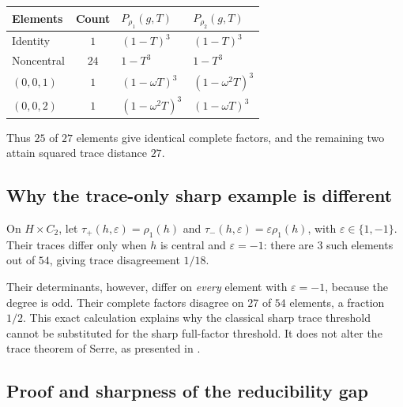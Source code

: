 \documentclass[11pt]{article}
\theoremstyle{definition}\newtheorem{definition}[theorem]{Definition}
\theoremstyle{remark}\newtheorem{remark}[theorem]{Remark}
\begin{document}
\begin{center}
\begin{tabular}{@{}lcll@{}}\toprule
Elements & Count & $P_{\rho_1}(g,T)$ & $P_{\rho_2}(g,T)$\\\midrule
Identity & $1$ & $(1-T)^3$ & $(1-T)^3$\\
Noncentral & $24$ & $1-T^3$ & $1-T^3$\\
$(0,0,1)$ & $1$ & $(1-\omega T)^3$ & $(1-\omega^2T)^3$\\
$(0,0,2)$ & $1$ & $(1-\omega^2T)^3$ & $(1-\omega T)^3$\\\bottomrule
\end{tabular}
\end{center}
Thus $25$ of $27$ elements give identical complete factors, and the remaining two attain squared trace distance $27$.

\subsection{Why the trace-only sharp example is different}

On $H\times C_2$, let $\tau_+(h,\varepsilon)=\rho_1(h)$ and
$\tau_-(h,\varepsilon)=\varepsilon\rho_1(h)$, with $\varepsilon\in\{1,-1\}$. Their traces differ only when $h$ is central and $\varepsilon=-1$: there are $3$ such elements out of $54$, giving trace disagreement $1/18$.

Their determinants, however, differ on \emph{every} element with $\varepsilon=-1$, because the degree is odd. Their complete factors disagree on $27$ of $54$ elements, a fraction $1/2$. This exact calculation explains why the classical sharp trace threshold cannot be substituted for the sharp full-factor threshold. It does not alter the trace theorem of Serre, as presented in \cite{MartinWalji}.

\subsection{Proof and sharpness of the reducibility gap}
\end{document}
